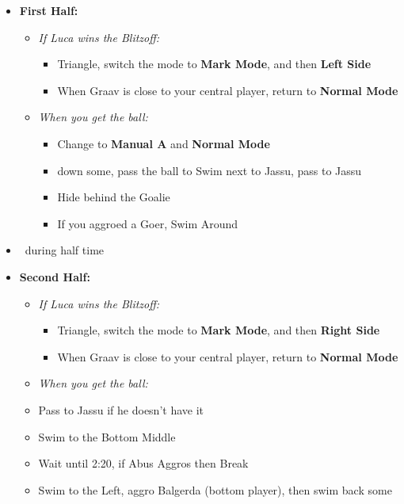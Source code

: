 \begin{blitzball}
	\begin{itemize}
		\item \textbf{First Half:}
		      \begin{itemize}
			      \item \textit{If Luca wins the Blitzoff:}
			            \begin{itemize}
				            \item Triangle, switch the mode to \textbf{Mark Mode}, and then \textbf{Left Side}
				            \item When Graav is close to your central player, return to \textbf{Normal Mode}
			            \end{itemize}
			      \item \textit{When you get the ball:}
			            \begin{itemize}
				            \item Change to \textbf{Manual A} and \textbf{Normal Mode}
				            \item down some, pass the ball to \tidus
				                  \tidusf Swim next to Jassu, pass to Jassu
				            \item Hide behind the Goalie
				            \item If you aggroed a Goer, Swim Around
			            \end{itemize}
		      \end{itemize}
		\item \sd\ during half time
		\item \textbf{Second Half:}
		      \begin{itemize}
			      \item \textit{If Luca wins the Blitzoff:}
			            \begin{itemize}
				            \item Triangle, switch the mode to \textbf{Mark Mode}, and then \textbf{Right Side}
				            \item When Graav is close to your central player, return to \textbf{Normal Mode}
			            \end{itemize}
			      \item \textit{When you get the ball:}
			      \item Pass to Jassu if he doesn't have it
			      \item Swim to the Bottom Middle
			      \item Wait until 2:20, if Abus Aggros then Break
			      \item Swim to the Left, aggro Balgerda (bottom player), then swim back some

\end{itemize}
\end{itemize}
\end{blitzball}
